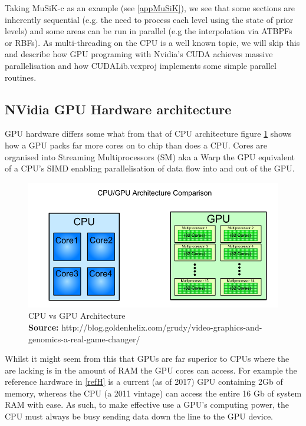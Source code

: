 \documentclass[a4paper]{amsart}
\newcommand*{\captionsource}[2]{%
  \caption[{#1}]{%
    #1%
    \\\hspace{\linewidth}%
    \textbf{Source:} #2%
  }%
}
\begin{document}
Taking MuSiK-c as an example (see \ref{appMuSiK}), we see that some sections are inherently sequential (e.g. the need to process each level using the state of prior levels) and some areas can be run in parallel (e.g the interpolation via ATBPFs or RBFs). As multi-threading on the CPU is a well known topic, we will skip this and describe how GPU programing with Nvidia's CUDA achieves massive parallelisation and how CUDALib.vcxproj implements some simple parallel routines.

\subsection {NVidia GPU Hardware architecture}

GPU hardware differs some what from that of CPU architecture figure \ref{fig:CPUGPU} shows how a GPU packs far more cores on to chip than does a CPU. Cores are organised into Streaming Multiprocessors (SM) aka a Warp the GPU equivalent of a CPU's SIMD enabling parallelisation of data flow into and out of the GPU.

\begin{figure}[h]
\centering
\includegraphics[scale=0.5]{cpu_vs_gpu-1.png}
\captionsource{CPU vs GPU Architecture}{ http://blog.goldenhelix.com/grudy/video-graphics-and-genomics-a-real-game-changer/}
\label {fig:CPUGPU}
\end{figure}

Whilst it might seem from this that GPUs are far superior to CPUs where the are lacking is in the amount of RAM the GPU cores can access. For example the reference hardware in \ref{refH} is a current (as of 2017) GPU containing 2Gb of memory, whereas the CPU (a 2011 vintage) can access the entire 16 Gb of system RAM with ease. As such, to make effective use a GPU's computing power, the CPU must always be busy sending data down the line to the GPU device.
\end{document}
